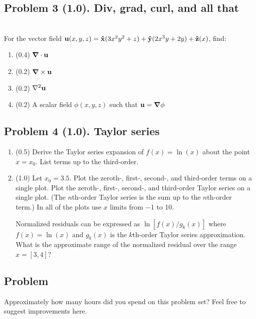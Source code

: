\documentclass[11pt,titlepage,fleqn]{article}
\begin{document}

\subsection*{Problem 3 (1.0). Div, grad, curl, and all that}

\citep[][p.~473, P13]{SteinWysession} \\
For the vector field $\mbox{${\bf u}$}(x,y,z) = \mbox{\boldmath{$\hat{\rm x}$}}(3x^2y^2 + z) + \mbox{\boldmath{$\hat{\rm y}$}}(2x^3y+2y) + \mbox{\boldmath{$\hat{\rm z}$}}(x)$, find:
%
\begin{enumerate}
\item (0.4) $\mbox{\boldmath $\nabla$} \cdot \mbox{${\bf u}$}$
\item (0.2) $\mbox{\boldmath $\nabla$} \times \mbox{${\bf u}$}$
\item (0.2) $\nabla^2\mbox{${\bf u}$}$
\item (0.2) A scalar field $\phi(x,y,z)$ such that $\mbox{${\bf u}$}=\mbox{\boldmath $\nabla$}\phi$
\end{enumerate}


\subsection*{Problem 4 (1.0). Taylor series}

\begin{enumerate}
\item (0.5) Derive the Taylor series expansion of $f(x) = \ln(x)$ about the point $x = x_0$. List terms up to the third-order.

\item (1.0) Let $x_0 = 3.5$. Plot the zeroth-, first-, second-, and third-order terms on a single plot. Plot the zeroth-, first-, second-, and third-order Taylor series on a single plot. (The $n$th-order Taylor series is the sum up to the $n$th-order term.) In all of the plots use $x$ limits from $-1$ to 10.

Normalized residuals can be expressed as $\ln[ f(x) / g_k(x) ]$ where $f(x) = \ln(x)$ and $g_k(x)$ is the $k$th-order Taylor series approximation. What is the approximate range of the normalized residual over the range $x = [3,4]$?

\end{enumerate}


\subsection*{Problem}

Approximately how many hours did you spend on this problem set? Feel free to suggest improvements here.




\clearpage\pagebreak


\end{document}
